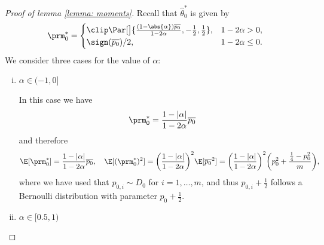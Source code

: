 \begin{proof}[Proof of lemma \ref{lemma: moments}]
Recall that $\hat{\theta}_0^\ast$ is given by
\[
        \prm^*_0 =
        \begin{cases}
            \clip\Par[\big]{\frac{(1 - \abs{\alpha}) \overline{p_0}}{1 - 2 \alpha},
            -\frac{1}{2}, \frac{1}{2}}, & 1 - 2 \alpha > 0,\\
            \sign(\overline{p_0}) / 2, & 1 - 2 \alpha \le 0.
        \end{cases}
\]
We consider three cases for the value of $\alpha$: 
\begin{enumerate}[(i)]
\item $\alpha \in (-1, 0]$

In this case we have 
\begin{equation*}
	\prm^\ast_0 = \frac{1 - |\alpha|}{1-2\alpha} \overline{p_0}
\end{equation*}
and therefore 
\begin{equation*}
	\E[\prm^\ast_0] = \frac{1 - |\alpha|}{1-2\alpha} \overline{p_0}, \quad \E[(\prm^\ast_0)^2] = \bigg( \frac{1 - |\alpha|}{1-2\alpha}\bigg)^2\E[\overline{p_0}^2] = \bigg( \frac{1 - |\alpha|}{1-2\alpha}\bigg)^2\bigg( p_0^2 + \frac{\frac14 - p_0^2}{m}\bigg),
\end{equation*}
where we have used that $p_{0, i} \sim D_0$ for $i=1, \dots, m$, and thus $p_{0,i} + \frac12$ follows a Bernoulli distribution with parameter $p_0 + \frac12$. 

\item $\alpha \in [0.5, 1)$


\end{enumerate}
\end{proof}
